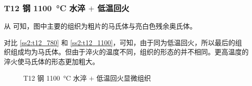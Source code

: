 \documentclass[a4paper,utf8]{article}
\begin{document}
    \subsubsection{T12 钢 \SI{1100}{\degreeCelsius} 水淬 $+$ 低温回火\label{ss2:t12_1100}}
    从 可知，图中主要的组织为粗片的马氏体与亮白色残余奥氏体。\par
    对比 \ref{ss2:t12_780} 和 \ref{ss2:t12_1100}，可知，由于同为低温回火，所以最后的组织组成均为马氏体。但由于淬火的温度不同，组织的形态的并不相同。更高温度的淬火使马氏体的形态更加粗大。
    \begin{figure}[!ht]
        \hspace{20pt}
        \caption{T12 钢 \SI{1100}{\degreeCelsius} 水淬 $+$ 低温回火显微组织\label{fig:n14}}
    \end{figure}
\end{document}
